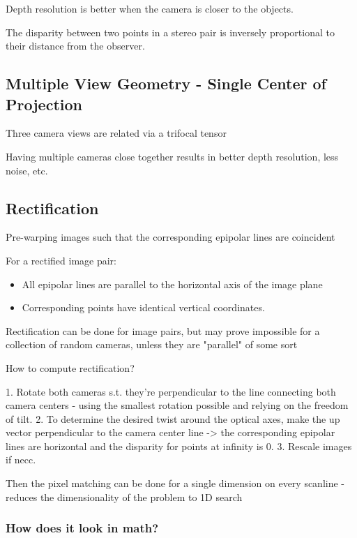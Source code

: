 Depth resolution is better when the camera is closer to the objects.

The disparity between two points in a stereo pair is inversely proportional to their distance from the observer.


\subsection{Multiple View Geometry - Single Center of Projection}

Three camera views are related via a trifocal tensor 

Having multiple cameras close together results in better depth resolution, less noise, etc.

\subsection{Rectification}

Pre-warping images such that the corresponding epipolar lines are coincident

For a rectified image pair:

\begin{itemize}
\item All epipolar lines are parallel to the horizontal axis of the image plane
\item Corresponding points have identical vertical coordinates.
\end{itemize}

Rectification can be done for image pairs, but may prove impossible for a collection of random cameras, unless they are "parallel" of some sort

How to compute rectification?

1. Rotate both cameras s.t. they're perpendicular to the line connecting both camera centers - using the smallest rotation possible and relying on the freedom of tilt. 
2. To determine the desired twist around the optical axes, make the up vector perpendicular to the camera center line -> the corresponding epipolar lines are horizontal and the disparity for points at infinity is 0. 
3. Rescale images if necc.

Then the pixel matching can be done for a single dimension on every scanline - reduces the dimensionality of the problem to 1D search

\subsubsection{How does it look in math?}

